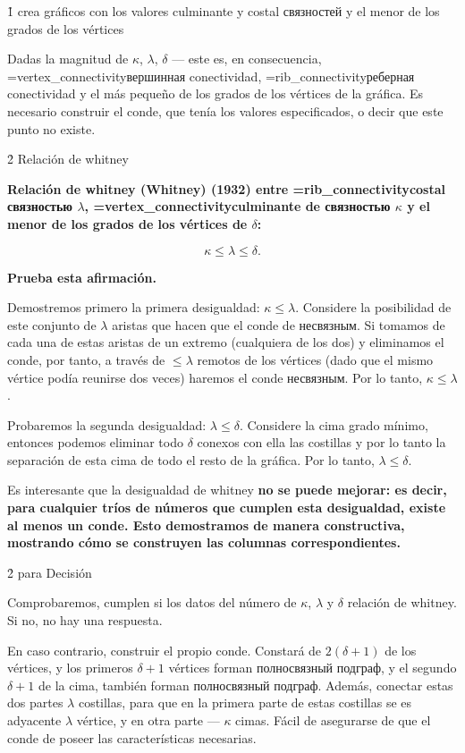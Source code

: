 \h1{ crea gráficos con los valores culminante y costal связностей y el menor de los grados de los vértices }

Dadas la magnitud de $\kappa$, $\lambda$, $\delta$ --- este es, en consecuencia, \algohref=vertex_connectivity{вершинная conectividad}, \algohref=rib_connectivity{реберная conectividad} y el más pequeño de los grados de los vértices de la gráfica. Es necesario construir el conde, que tenía los valores especificados, o decir que este punto no existe.


\h2{ Relación de whitney }

\bf{Relación de whitney (Whitney)} (1932) entre \algohref=rib_connectivity{costal связностью} $\lambda$, \algohref=vertex_connectivity{culminante de связностью} $\kappa$ y el menor de los grados de los vértices de $\delta$:

$$ \kappa \le \lambda \le \delta. $$

\bf{Prueba} esta afirmación.

Demostremos primero la primera desigualdad: $\kappa \le \lambda$. Considere la posibilidad de este conjunto de $\lambda$ aristas que hacen que el conde de несвязным. Si tomamos de cada una de estas aristas de un extremo (cualquiera de los dos) y eliminamos el conde, por tanto, a través de $\le \lambda$ remotos de los vértices (dado que el mismo vértice podía reunirse dos veces) haremos el conde несвязным. Por lo tanto, $\kappa \le \lambda$.

Probaremos la segunda desigualdad: $\lambda \le \delta$. Considere la cima grado mínimo, entonces podemos eliminar todo $\delta$ conexos con ella las costillas y por lo tanto la separación de esta cima de todo el resto de la gráfica. Por lo tanto, $\lambda \le \delta$.

Es interesante que la desigualdad de whitney \bf{no se puede mejorar}: es decir, para cualquier tríos de números que cumplen esta desigualdad, existe al menos un conde. Esto demostramos de manera constructiva, mostrando cómo se construyen las columnas correspondientes.


\h2{ para Decisión }

Comprobaremos, cumplen si los datos del número de $\kappa$, $\lambda$ y $\delta$ relación de whitney. Si no, no hay una respuesta.

En caso contrario, construir el propio conde. Constará de $2 (\delta + 1)$ de los vértices, y los primeros $\delta + 1$ vértices forman полносвязный подграф, y el segundo $\delta + 1$ de la cima, también forman полносвязный подграф. Además, conectar estas dos partes $\lambda$ costillas, para que en la primera parte de estas costillas se es adyacente $\lambda$ vértice, y en otra parte --- $\kappa$ cimas. Fácil de asegurarse de que el conde de poseer las características necesarias.